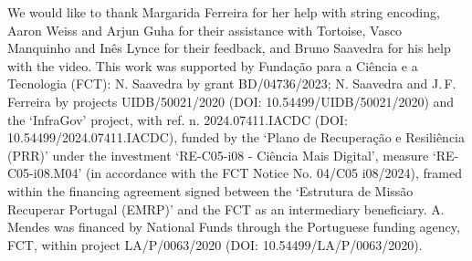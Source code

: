 \documentclass[sigconf,nonacm]{acmart}
\begin{document}
\begin{acks}
We would like to thank Margarida Ferreira for her help with string encoding, Aaron Weiss and Arjun Guha for their assistance with Tortoise, Vasco Manquinho and Inês Lynce for their feedback, and Bruno Saavedra for his help with the video.
This work was supported by Fundação para a Ciência e a Tecnologia (FCT): N. Saavedra by grant BD/04736/2023;
N. Saavedra and J.\,F. Ferreira by
projects UIDB/50021/2020 (DOI: 10.54499/UIDB/50021/2020) and the `InfraGov' project, with ref. n. 2024.07411.IACDC (DOI: 10.54499/2024.07411.IACDC), funded by the `Plano de Recuperação e Resiliência (PRR)' under the investment `RE-C05-i08 - Ciência Mais Digital', measure `RE-C05-i08.M04' (in accordance with the FCT Notice No. 04/C05 i08/2024), framed within the financing agreement signed between the `Estrutura de Missão Recuperar Portugal (EMRP)' and the FCT as an intermediary beneficiary.
A. Mendes was financed by National Funds through the Portuguese funding agency, FCT, within project LA/P/0063/2020 (DOI: 10.54499/LA/P/0063/2020).



\end{acks}




\end{document}
